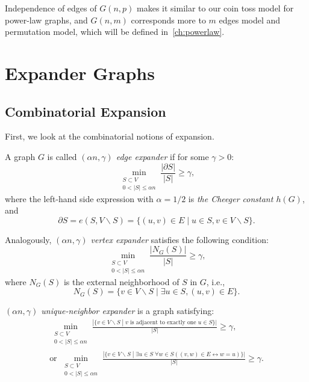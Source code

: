 Independence of edges of $G(n,p)$ makes it similar to our coin toss model for power-law graphs,
and $G(n,m)$ corresponds more to $m$ edges model and permutation model,
which will be defined in~\autoref{ch:powerlaw}.

\section{Expander Graphs}

\subsection{Combinatorial Expansion}

First, we look at the combinatorial notions of expansion.

\begin{definition}
    A graph $G$ is called \textit{$(\alpha n,\gamma)$ edge expander} if for some $\gamma>0$:
    \begin{equation}
        \min_{\substack{S\subset V\\0<|S|\leq\alpha n}}\frac{|\partial S|}{|S|}\geq\gamma,
    \end{equation}
    where the left-hand side expression with $\alpha=1/2$ is \textit{the Cheeger constant $h(G)$}, and
    \begin{equation}
        \partial S=e(S,V\backslash S)=\{(u,v)\in E\;|\;u\in S,v\in V\backslash S\}.
    \end{equation}
\end{definition}

\begin{definition}
    Analogously, \textit{$(\alpha n,\gamma)$ vertex expander} satisfies the following condition:
    \begin{equation}
        \min_{\substack{S\subset V\\0<|S|\leq\alpha n}}\frac{|N_G(S)|}{|S|}\geq\gamma,
    \end{equation}
    where $N_G(S)$ is the external neighborhood of $S$ in $G$, i.e.,
    \begin{equation}
        N_G(S)=\{v\in V\backslash S\;|\;\exists u\in S, (u,v)\in E\}.
    \end{equation}
\end{definition}

\begin{definition}
    \textit{$(\alpha n,\gamma)$ unique-neighbor expander} is a graph satisfying:
    \begin{equation}
        \begin{split}
            \min_{\substack{S\subset V\\0<|S|\leq\alpha n}}
            \frac{|\{v\in V\backslash S\;|\;v\text{ is adjacent to exactly one }u\in S\}|}{|S|}\geq\gamma,\\
            \text{or }\min_{\substack{S\subset V\\0<|S|\leq\alpha n}}
            \frac{|\{v\in V\backslash S\;|\;\exists u\in S\;\forall w\in S ((v,w)\in E\longleftrightarrow w=u)\}|}{|S|}\geq\gamma.
        \end{split}
    \end{equation}
\end{definition}

